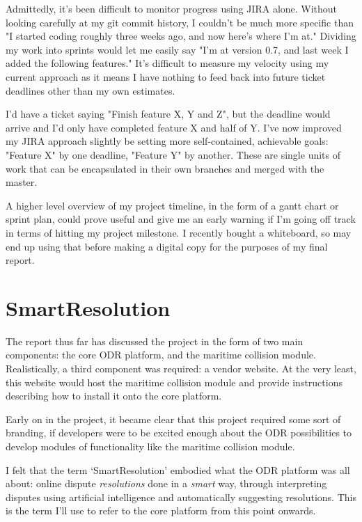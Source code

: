 Admittedly, it's been difficult to monitor progress using JIRA alone. Without looking carefully at my git commit history, I couldn't be much more specific than "I started coding roughly three weeks ago, and now here's where I'm at." Dividing my work into sprints would let me easily say "I'm at version 0.7, and last week I added the following features." It's difficult to measure my velocity using my current approach as it means I have nothing to feed back into future ticket deadlines other than my own estimates.

I'd have a ticket saying "Finish feature X, Y and Z", but the deadline would arrive and I'd only have completed feature X and half of Y. I've now improved my JIRA approach slightly be setting more self-contained, achievable goals: "Feature X" by one deadline, "Feature Y" by another. These are single units of work that can be encapsulated in their own branches and merged with the master.

A higher level overview of my project timeline, in the form of a gantt chart or sprint plan, could prove useful and give me an early warning if I'm going off track in terms of hitting my project milestone. I recently bought a whiteboard, so may end up using that before making a digital copy for the purposes of my final report.

\section{SmartResolution}

The report thus far has discussed the project in the form of two main components: the core ODR platform, and the maritime collision module. Realistically, a third component was required: a vendor website. At the very least, this website would host the maritime collision module and provide instructions describing how to install it onto the core platform.

Early on in the project, it became clear that this project required some sort of branding, if developers were to be excited enough about the ODR possibilities to develop modules of functionality like the maritime collision module.

I felt that the term `SmartResolution' embodied what the ODR platform was all about: online dispute \emph{resolutions} done in a \emph{smart} way, through interpreting disputes using artificial intelligence and automatically suggesting resolutions. This is the term I'll use to refer to the core platform from this point onwards.